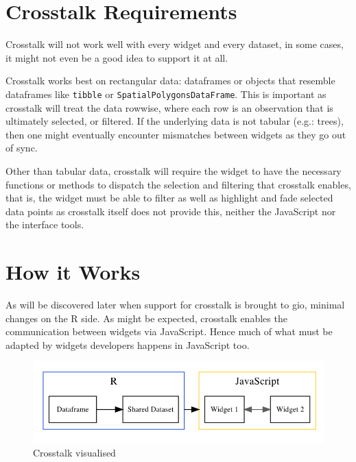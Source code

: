 \documentclass[
  10pt,
]{krantz}
\begin{document}
\hypertarget{linking-widgets-req}{%
\section{Crosstalk Requirements}\label{linking-widgets-req}}

Crosstalk will not work well with every widget and every dataset, in some cases, it might not even be a good idea to support it at all.

Crosstalk works best on rectangular data: dataframes or objects that resemble dataframes like \texttt{tibble} or \texttt{SpatialPolygonsDataFrame}. This is important as crosstalk will treat the data rowwise, where each row is an observation that is ultimately selected, or filtered. If the underlying data is not tabular (e.g.: trees), then one might eventually encounter mismatches between widgets as they go out of sync.

Other than tabular data, crosstalk will require the widget to have the necessary functions or methods to dispatch the selection and filtering that crosstalk enables, that is, the widget must be able to filter as well as highlight and fade selected data points as crosstalk itself does not provide this, neither the JavaScript nor the interface tools.

\hypertarget{linking-widgets-inner-workings}{%
\section{How it Works}\label{linking-widgets-inner-workings}}

As will be discovered later when support for crosstalk is brought to gio, minimal changes on the R side. As might be expected, crosstalk enables the communication between widgets via JavaScript. Hence much of what must be adapted by widgets developers happens in JavaScript too.

\begin{figure}[H]

{\centering \includegraphics[width=1\linewidth]{images/03-crosstalk-viz} 

}

\caption{Crosstalk visualised}\label{fig:crosstalk-diagram}
\end{figure}
\end{document}
